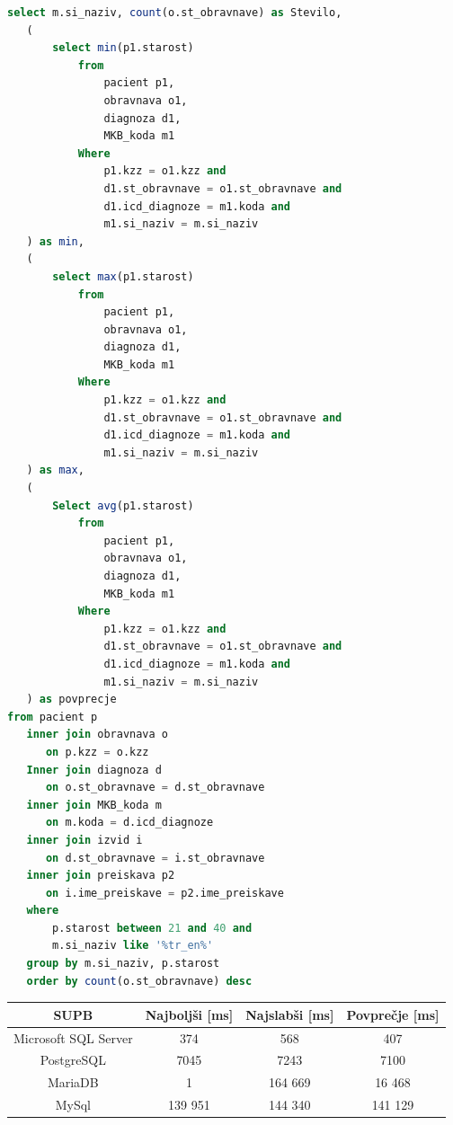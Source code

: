 \documentclass[a4paper,11pt]{report}
\begin{document}
\begin{lstlisting}[language = SQL]
   select m.si_naziv, count(o.st_obravnave) as Stevilo,
   (
       select min(p1.starost)
           from
               pacient p1,
               obravnava o1,
               diagnoza d1,
               MKB_koda m1
           Where
               p1.kzz = o1.kzz and
               d1.st_obravnave = o1.st_obravnave and
               d1.icd_diagnoze = m1.koda and
               m1.si_naziv = m.si_naziv
   ) as min,
   (
       select max(p1.starost)
           from
               pacient p1,
               obravnava o1,
               diagnoza d1,
               MKB_koda m1
           Where
               p1.kzz = o1.kzz and
               d1.st_obravnave = o1.st_obravnave and
               d1.icd_diagnoze = m1.koda and
               m1.si_naziv = m.si_naziv
   ) as max,
   (
       Select avg(p1.starost)
           from
               pacient p1,
               obravnava o1,
               diagnoza d1,
               MKB_koda m1
           Where
               p1.kzz = o1.kzz and
               d1.st_obravnave = o1.st_obravnave and
               d1.icd_diagnoze = m1.koda and
               m1.si_naziv = m.si_naziv
   ) as povprecje
from pacient p
   inner join obravnava o 
      on p.kzz = o.kzz
   Inner join diagnoza d 
      on o.st_obravnave = d.st_obravnave
   inner join MKB_koda m 
      on m.koda = d.icd_diagnoze
   inner join izvid i 
      on d.st_obravnave = i.st_obravnave
   inner join preiskava p2 
      on i.ime_preiskave = p2.ime_preiskave
   where
       p.starost between 21 and 40 and
       m.si_naziv like '%tr_en%'
   group by m.si_naziv, p.starost
   order by count(o.st_obravnave) desc
\end{lstlisting}

\begin{center}
   \begin{tabular}{||c|c|c|c||}
      \hline
      \textbf{SUPB} & \textbf{Najboljši [ms]} & \textbf{Najslabši [ms]} & \textbf{Povprečje [ms]}\\
      \hline
      \hline
      Microsoft SQL Server & 374 & 568 & 407 \\
      PostgreSQL & 7045 & 7243 & 7100 \\
      MariaDB & 1 & 164 669 & 16 468 \\
      MySql & 139 951 & 144 340 & 141 129\\
      \hline
   \end{tabular}
\end{center}
\end{document}
